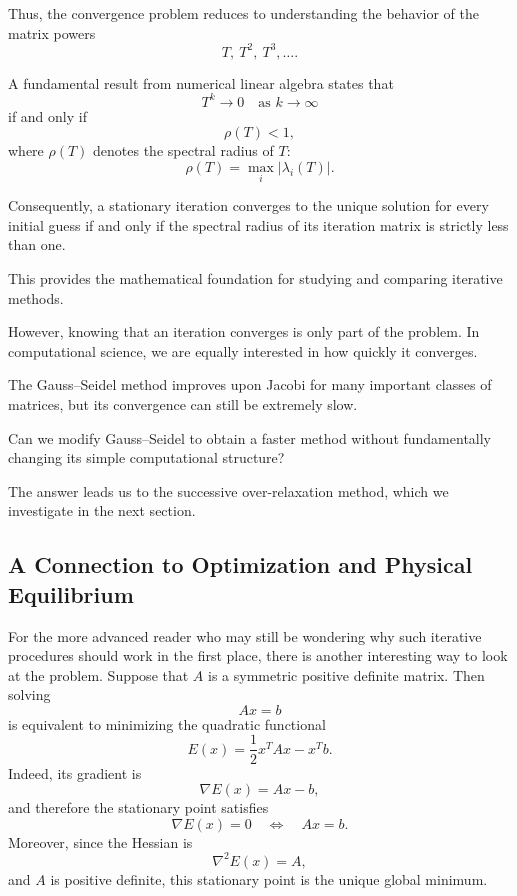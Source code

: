 \documentclass[11pt,a4paper]{article}
\theoremstyle{definition}
\theoremstyle{remark}
\begin{document}
Thus, the convergence problem reduces to
understanding the behavior of the matrix powers
\[
    T,\ T^2,\ T^3,\ldots.
\]

A fundamental result from numerical linear algebra
states that
\[
    T^k\longrightarrow0
    \quad\text{as }k\to\infty
\]
if and only if
\[
    \boxed{\rho(T)<1,}
\]
where $\rho(T)$ denotes the spectral radius of $T$:
\[
    \rho(T)=\max_i|\lambda_i(T)|.
\]

Consequently, a stationary iteration converges
to the unique solution for every initial guess
if and only if the spectral radius of its
iteration matrix is strictly less than one.

This provides the mathematical foundation for
studying and comparing iterative methods.

However, knowing that an iteration converges
is only part of the problem. In computational
science, we are equally interested in how
quickly it converges.

The Gauss--Seidel method improves upon Jacobi
for many important classes of matrices, but
its convergence can still be extremely slow.

Can we modify Gauss--Seidel to obtain a faster
method without fundamentally changing its
simple computational structure?

The answer leads us to the successive
over-relaxation method, which we investigate
in the next section.


\subsection*{A Connection to Optimization and Physical Equilibrium}

For the more advanced reader who may still be wondering
why such iterative procedures should work in the first
place, there is another interesting way to look at the
problem. Suppose that $A$ is a symmetric positive
definite matrix. Then solving
\[
    Ax=b
\]
is equivalent to minimizing the quadratic functional
\[
    \boxed{
    E(x)=\frac12 x^T A x-x^T b.
    }
\]
Indeed, its gradient is
\[
    \nabla E(x)=Ax-b,
\]
and therefore the stationary point satisfies
\[
    \nabla E(x)=0
    \quad\Longleftrightarrow\quad
    Ax=b.
\]
Moreover, since the Hessian is
\[
    \nabla^2 E(x)=A,
\]
and $A$ is positive definite, this stationary point
is the unique global minimum.
\end{document}
